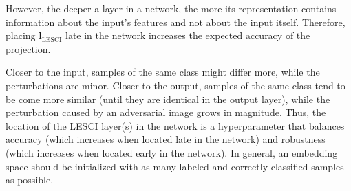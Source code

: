 \documentclass{article}
\begin{document}
However, the deeper a layer in a network, the more its representation contains information about the input's features and not about the input itself. Therefore, placing $\bm{l}_\text{LESCI}$ late in the network increases the expected accuracy of the projection. 

Closer to the input, samples of the same class might differ more, while the perturbations are minor. Closer to the output, samples of the same class tend to be come more similar (until they are identical in the output layer), while the perturbation caused by an adversarial image grows in magnitude.
Thus, the location of the LESCI layer(s) in the network is a hyperparameter that balances accuracy (which increases when located late in the network) and robustness (which increases when located early in the network). In general, an embedding space should be initialized with as many labeled and correctly classified samples as possible.


\end{document}
